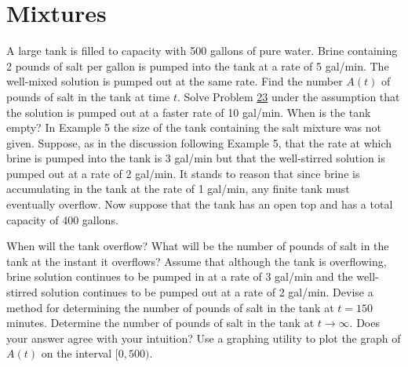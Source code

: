 \documentclass[chapter=3,section=1]{math252homework}
\begin{document}
\section{Mixtures}\label{sec:mixtures}
\begin{problems}[start=23]
	\problem A large tank is filled to capacity with 500 gallons of pure water. Brine containing 2 pounds of salt per gallon is pumped into the tank at a rate of 5 gal/min. The well-mixed solution is pumped out at the same rate. Find the number $A(t)$ of pounds of salt in the tank at time $t$.
	\setcounter{problemsi}{24}
	\problem Solve Problem \hyperref[prb:23]{23} under the assumption that the solution is pumped out at a faster rate of 10 gal/min. When is the tank empty?
	\setcounter{problemsi}{27}
	\problem In Example 5 the size of the tank containing the salt mixture was not given. Suppose, as in the discussion following Example 5, that the rate at which brine is pumped into the tank is 3 gal/min but that the well-stirred solution is pumped out at a rate of 2 gal/min. It stands to reason that since brine is accumulating in the tank at the rate of 1 gal/min, any finite tank must eventually overflow. Now suppose that the tank has an open top and has a total capacity of 400 gallons.
	\begin{problems}
	    \subproblem When will the tank overflow?
		\subproblem What will be the number of pounds of salt in the tank at the instant it overflows?
		\subproblem Assume that although the tank is overflowing, brine solution continues to be pumped in at a rate of 3 gal/min and the well-stirred solution continues to be pumped out at a rate of 2 gal/min. Devise a method for determining the number of pounds of salt in the tank at $t=150$ minutes.
		\subproblem Determine the number of pounds of salt in the tank at $t\rightarrow\infty$. Does your answer agree with your intuition?
		\subproblem Use a graphing utility to plot the graph of $A(t)$ on the interval $[0, 500)$.
	\end{problems}
\end{problems}
\end{document}
